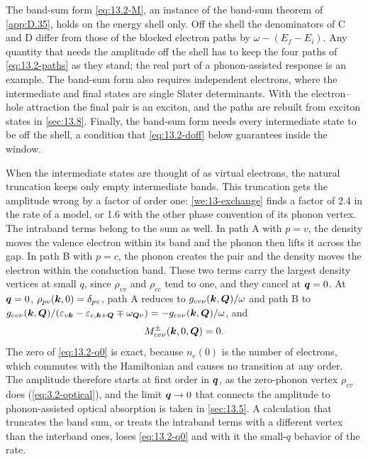 The band-sum form \cref{eq:13.2-M}, an instance of the band-sum theorem of \cref{app:D.35}, holds on the energy shell only. Off the shell the denominators of C and D differ from those of the blocked electron paths by $\omega - (E_f - E_i)$. Any quantity that needs the amplitude off the shell has to keep the four paths of \cref{eq:13.2-paths} as they stand; the real part of a phonon-assisted response is an example. The band-sum form also requires independent electrons, where the intermediate and final states are single Slater determinants. With the electron--hole attraction the final pair is an exciton, and the paths are rebuilt from exciton states in \cref{sec:13.8}. Finally, the band-sum form needs every intermediate state to be off the shell, a condition that \cref{eq:13.2-doff} below guarantees inside the window.

When the intermediate states are thought of as virtual electrons, the natural truncation keeps only empty intermediate bands. This truncation gets the amplitude wrong by a factor of order one: \cref{we:13-exchange} finds a factor of 2.4 in the rate of a model, or 1.6 with the other phase convention of its phonon vertex. The intraband terms belong to the sum as well. In path A with $p = v$, the density moves the valence electron within its band and the phonon then lifts it across the gap. In path B with $p = c$, the phonon creates the pair and the density moves the electron within the conduction band. These two terms carry the largest density vertices at small $q$, since $\rho_{vv}$ and $\rho_{cc}$ tend to one, and they cancel at $\bm{q} = 0$. At $\bm{q} = 0$, $\rho_{pv}(\bm{k},0) = \delta_{pv}$, path A reduces to $g_{cv\nu}(\bm{k},\bm{Q})/\omega$ and path B to $g_{cv\nu}(\bm{k},\bm{Q})/(\varepsilon_{v\bm{k}} - \varepsilon_{c,\bm{k}+\bm{Q}} \mp \omega_{\bm{Q}\nu}) = -g_{cv\nu}(\bm{k},\bm{Q})/\omega$, and
\begin{equation}
  M^{\pm}_{cv\nu}(\bm{k},0,\bm{Q}) = 0 .
  \label{eq:13.2-q0}
\end{equation}
The zero of \cref{eq:13.2-q0} is exact, because $n_e(0)$ is the number of electrons, which commutes with the Hamiltonian and causes no transition at any order. The amplitude therefore starts at first order in $\bm{q}$, as the zero-phonon vertex $\rho_{cv}$ does (\cref{eq:3.2-optical}), and the limit $\bm{q}\to0$ that connects the amplitude to phonon-assisted optical absorption is taken in \cref{sec:13.5}. A calculation that truncates the band sum, or treats the intraband terms with a different vertex than the interband ones, loses \cref{eq:13.2-q0} and with it the small-$q$ behavior of the rate.

